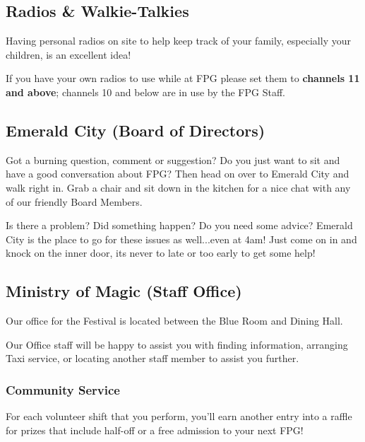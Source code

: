 \documentclass[9pt,twoside,openright,final,article,letterpaper]{memoir}
\renewcommand{\pfbreakdisplay}{%
  \needspace{24pt}%
  \vspace{8pt}\\\ding{76}\quad\ding{77}\quad\ding{78}\\%
  \vspace{11pt}}
\let\oldsubsection=\subsection
\renewcommand{\subsection}[1]{%
  \vspace{6pt}
  \needspace{1.25in}
  \oldsubsection{#1}
  \nopagebreak}
\let\oldsubsubsection=\subsubsection
\renewcommand{\subsubsection}[1]{%
  \needspace{.75in}
  \oldsubsubsection{#1}
  \nopagebreak}
\begin{document}
\begin{multicols}{2}

  \subsection{Radios \& Walkie-Talkies}

  Having personal radios on site to help keep track of your family,
  especially your children, is an excellent idea!

  If you have your own radios to use while at FPG please set them to
  \textbf{channels 11 and above}; channels 10 and below are in use by
  the FPG Staff.


  \subsection{Emerald City  {\small (Board of Directors)}}

  Got a burning question, comment or suggestion?  Do you just want to
  sit and have a good conversation about FPG?  Then head on over to
  Emerald City and walk right in.  Grab a chair and sit down in the
  kitchen for a nice chat with any of our friendly Board Members.

  Is there a problem?  Did something happen?  Do you need some advice?
  Emerald City is the place to go for these issues as well...even at
  4am!  Just come on in and knock on the inner door, its never to late
  or too early to get some help!


  \subsection{Ministry of Magic {\small (Staff Office)}}

  Our office for the Festival is located between the Blue Room and
  Dining Hall.

  Our Office staff will be happy to assist you with finding
  information, arranging Taxi service, or locating another staff
  member to assist you further.

  \subsubsection{Community Service}

  For each volunteer shift that you perform, you'll earn another entry
  into a raffle for prizes that include half-off or a free admission
  to your next FPG!


\end{multicols}
\end{document}
